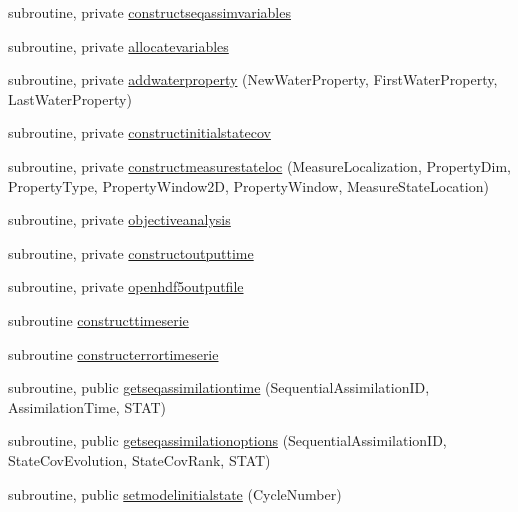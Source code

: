 \begin{DoxyCompactItemize}
\item 
subroutine, private \mbox{\hyperlink{namespacemodulesequentialassimilation_adb290ebd31525621b87da4ea0f2c443c}{constructseqassimvariables}}
\item 
subroutine, private \mbox{\hyperlink{namespacemodulesequentialassimilation_af08be0960351f7f29fe3b0b796b72da3}{allocatevariables}}
\item 
subroutine, private \mbox{\hyperlink{namespacemodulesequentialassimilation_a891242d04c33e25fc2d6c1b0bbbcdb59}{addwaterproperty}} (New\+Water\+Property, First\+Water\+Property, Last\+Water\+Property)
\item 
subroutine, private \mbox{\hyperlink{namespacemodulesequentialassimilation_ab636e048b1738282bf697c69d3e4fd10}{constructinitialstatecov}}
\item 
subroutine, private \mbox{\hyperlink{namespacemodulesequentialassimilation_aa4ca5ec886a894c6fe06ffd71d5fcb55}{constructmeasurestateloc}} (Measure\+Localization, Property\+Dim, Property\+Type, Property\+Window2D, Property\+Window, Measure\+State\+Location)
\item 
subroutine, private \mbox{\hyperlink{namespacemodulesequentialassimilation_a09e6002fa92db2aafb977540ff4479fb}{objectiveanalysis}}
\item 
subroutine, private \mbox{\hyperlink{namespacemodulesequentialassimilation_a4636d1cd0c10613f19a1ca651b6b482f}{constructoutputtime}}
\item 
subroutine, private \mbox{\hyperlink{namespacemodulesequentialassimilation_a6440d55f49615b21ea0d328d0121e669}{openhdf5outputfile}}
\item 
subroutine \mbox{\hyperlink{namespacemodulesequentialassimilation_a9aa173ea83e0e960fe1561e3a9f183be}{constructtimeserie}}
\item 
subroutine \mbox{\hyperlink{namespacemodulesequentialassimilation_aeee40d5724f1d4056ec3c81965e2d7c8}{constructerrortimeserie}}
\item 
subroutine, public \mbox{\hyperlink{namespacemodulesequentialassimilation_a79adcfc8fb983a24237bd6bba818eca8}{getseqassimilationtime}} (Sequential\+Assimilation\+ID, Assimilation\+Time, S\+T\+AT)
\item 
subroutine, public \mbox{\hyperlink{namespacemodulesequentialassimilation_a1df3565c62b239e627e2abf8edf5339e}{getseqassimilationoptions}} (Sequential\+Assimilation\+ID, State\+Cov\+Evolution, State\+Cov\+Rank, S\+T\+AT)
\item 
subroutine, public \mbox{\hyperlink{namespacemodulesequentialassimilation_a0b54df1b07a9718187dcc6448f23026c}{setmodelinitialstate}} (Cycle\+Number)

\end{DoxyCompactItemize}
